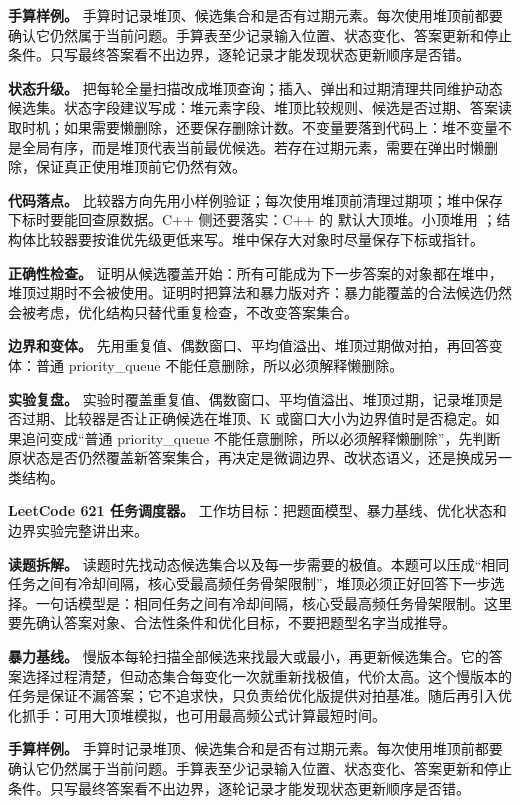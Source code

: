 \textbf{手算样例。} 手算时记录堆顶、候选集合和是否有过期元素。每次使用堆顶前都要确认它仍然属于当前问题。手算表至少记录输入位置、状态变化、答案更新和停止条件。只写最终答案看不出边界，逐轮记录才能发现状态更新顺序是否错。

\textbf{状态升级。} 把每轮全量扫描改成堆顶查询；插入、弹出和过期清理共同维护动态候选集。状态字段建议写成：堆元素字段、堆顶比较规则、候选是否过期、答案读取时机；如果需要懒删除，还要保存删除计数。不变量要落到代码上：堆不变量不是全局有序，而是堆顶代表当前最优候选。若存在过期元素，需要在弹出时懒删除，保证真正使用堆顶前它仍然有效。

\textbf{代码落点。} 比较器方向先用小样例验证；每次使用堆顶前清理过期项；堆中保存下标时要能回查原数据。C++ 侧还要落实：C++ 的  默认大顶堆。小顶堆用 ；结构体比较器要按谁优先级更低来写。堆中保存大对象时尽量保存下标或指针。

\textbf{正确性检查。} 证明从候选覆盖开始：所有可能成为下一步答案的对象都在堆中，堆顶过期时不会被使用。证明时把算法和暴力版对齐：暴力能覆盖的合法候选仍然会被考虑，优化结构只替代重复检查，不改变答案集合。

\textbf{边界和变体。} 先用重复值、偶数窗口、平均值溢出、堆顶过期做对拍，再回答变体：普通 priority\_queue 不能任意删除，所以必须解释懒删除。

\textbf{实验复盘。} 实验时覆盖重复值、偶数窗口、平均值溢出、堆顶过期，记录堆顶是否过期、比较器是否让正确候选在堆顶、K 或窗口大小为边界值时是否稳定。如果追问变成“普通 priority\_queue 不能任意删除，所以必须解释懒删除”，先判断原状态是否仍然覆盖新答案集合，再决定是微调边界、改状态语义，还是换成另一类结构。

\noindent\textbf{LeetCode 621 任务调度器。} 工作坊目标：把题面模型、暴力基线、优化状态和边界实验完整讲出来。

\textbf{读题拆解。} 读题时先找动态候选集合以及每一步需要的极值。本题可以压成“相同任务之间有冷却间隔，核心受最高频任务骨架限制”，堆顶必须正好回答下一步选择。一句话模型是：相同任务之间有冷却间隔，核心受最高频任务骨架限制。这里要先确认答案对象、合法性条件和优化目标，不要把题型名字当成推导。

\textbf{暴力基线。} 慢版本每轮扫描全部候选来找最大或最小，再更新候选集合。它的答案选择过程清楚，但动态集合每变化一次就重新找极值，代价太高。这个慢版本的任务是保证不漏答案；它不追求快，只负责给优化版提供对拍基准。随后再引入优化抓手：可用大顶堆模拟，也可用最高频公式计算最短时间。

\textbf{手算样例。} 手算时记录堆顶、候选集合和是否有过期元素。每次使用堆顶前都要确认它仍然属于当前问题。手算表至少记录输入位置、状态变化、答案更新和停止条件。只写最终答案看不出边界，逐轮记录才能发现状态更新顺序是否错。

